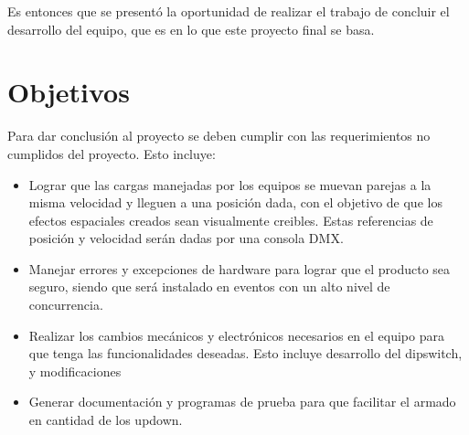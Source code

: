 Es entonces que se presentó la oportunidad de realizar el trabajo de concluir el desarrollo del equipo, que es en lo que este proyecto final se basa.


\newpage
\section{Objetivos}
Para dar conclusión al proyecto se deben cumplir con las requerimientos no cumplidos del proyecto. Esto incluye:
\begin{itemize}
	\item Lograr que las cargas manejadas por los equipos se muevan parejas a la misma velocidad y lleguen a una posición dada, con el objetivo de que los efectos espaciales creados sean visualmente creibles. Estas referencias de posición y velocidad serán dadas por una consola DMX.
	\item Manejar errores y excepciones de hardware para lograr que el producto sea seguro, siendo que será instalado en eventos con un alto nivel de concurrencia.
	\item Realizar los cambios mecánicos y electrónicos necesarios en el equipo para que tenga las funcionalidades deseadas. Esto incluye desarrollo del dipswitch, y modificaciones 
	\item Generar documentación y programas de prueba para que facilitar el armado en cantidad de los updown.
	
\end{itemize}







